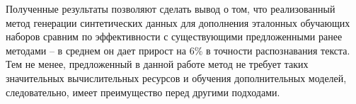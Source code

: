 Полученные результаты позволяют сделать вывод о том, что реализованный метод генерации синтетических данных для дополнения
эталонных обучающих наборов сравним по эффективности с существующими предложенными ранее методами --
в среднем он дает прирост на 6\% в точности распознавания текста.
Тем не менее, предложенный в данной работе метод не требует таких значительных вычислительных ресурсов и обучения дополнительных моделей,
следовательно, имеет преимущество перед другими подходами.